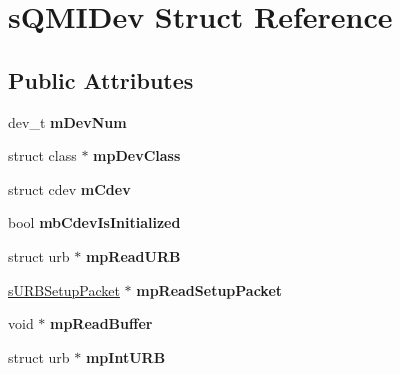 \hypertarget{structsQMIDev}{\section{s\-Q\-M\-I\-Dev \-Struct \-Reference}
\label{structsQMIDev}
}
\subsection*{\-Public \-Attributes}
\begin{DoxyCompactItemize}
\item 
\hypertarget{structsQMIDev_a8f849e962efa9eb4e02a1873278a37b1}{dev\-\_\-t {\bfseries m\-Dev\-Num}}\label{structsQMIDev_a8f849e962efa9eb4e02a1873278a37b1}

\item 
\hypertarget{structsQMIDev_a9c2b8111c30f015458cc0d9995862520}{struct class $\ast$ {\bfseries mp\-Dev\-Class}}\label{structsQMIDev_a9c2b8111c30f015458cc0d9995862520}

\item 
\hypertarget{structsQMIDev_a971e97b1204ec9e9e2835ec074a09488}{struct cdev {\bfseries m\-Cdev}}\label{structsQMIDev_a971e97b1204ec9e9e2835ec074a09488}

\item 
\hypertarget{structsQMIDev_a492fc2db24b67bfd4e82c240761db934}{bool {\bfseries mb\-Cdev\-Is\-Initialized}}\label{structsQMIDev_a492fc2db24b67bfd4e82c240761db934}

\item 
\hypertarget{structsQMIDev_af7ac5f92e9e84f66f4620427b910831f}{struct urb $\ast$ {\bfseries mp\-Read\-U\-R\-B}}\label{structsQMIDev_af7ac5f92e9e84f66f4620427b910831f}

\item 
\hypertarget{structsQMIDev_a1228358a6ff464a4898eb837de1fa364}{\hyperlink{structsURBSetupPacket}{s\-U\-R\-B\-Setup\-Packet} $\ast$ {\bfseries mp\-Read\-Setup\-Packet}}\label{structsQMIDev_a1228358a6ff464a4898eb837de1fa364}

\item 
\hypertarget{structsQMIDev_a7884ee5885c8f0f601c563fbceae88a5}{void $\ast$ {\bfseries mp\-Read\-Buffer}}\label{structsQMIDev_a7884ee5885c8f0f601c563fbceae88a5}

\item 
\hypertarget{structsQMIDev_ac5b6542a434fb2604c2edd4a29b8c10e}{struct urb $\ast$ {\bfseries mp\-Int\-U\-R\-B}}\label{structsQMIDev_ac5b6542a434fb2604c2edd4a29b8c10e}


\end{DoxyCompactItemize}
